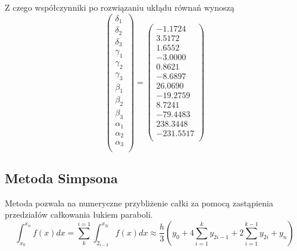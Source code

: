 \documentclass[varwidth,12pt,a4paper]{article}
\begin{document}
Z czego współczynniki po rozwiązaniu ukłądu równań wynoszą
$$
\left( \begin{array}{c}
\delta _1\\
\delta_2\\
\delta_3\\
\gamma _1\\
\gamma _2\\
\gamma_3\\
\beta _1\\
\beta _2\\
\beta _3\\
\alpha _1\\
\alpha _2\\
\alpha _3 \\
\end{array} \right) = \left( \begin{array}{c}
-1.1724 \\
3.5172 \\
1.6552 \\
-3.0000 \\
0.8621 \\
-8.6897 \\
26.0690 \\
-19.2759 \\
8.7241 \\
-79.4483 \\
238.3448 \\
-231.5517 \\
\end{array} \right) 
$$





\subsection{Metoda Simpsona}

Metoda pozwala na numeryczne przybliżenie całki za pomocą zastąpienia przedziałów całkowania łukiem paraboli.
\begin{equation}
\int_{x_0}^{x_n} f(x)dx = \sum_{k}^{i=1} \int_{2_{i-2}}^{x_{2i}} f(x)dx \approx \frac{h}{3}(y_0 + 4 \sum_{i=1}^{k} y_{2i-1} + 2 \sum_{i=1}^{k-1} y_{2i} + y_n)
\end{equation}
\end{document}
